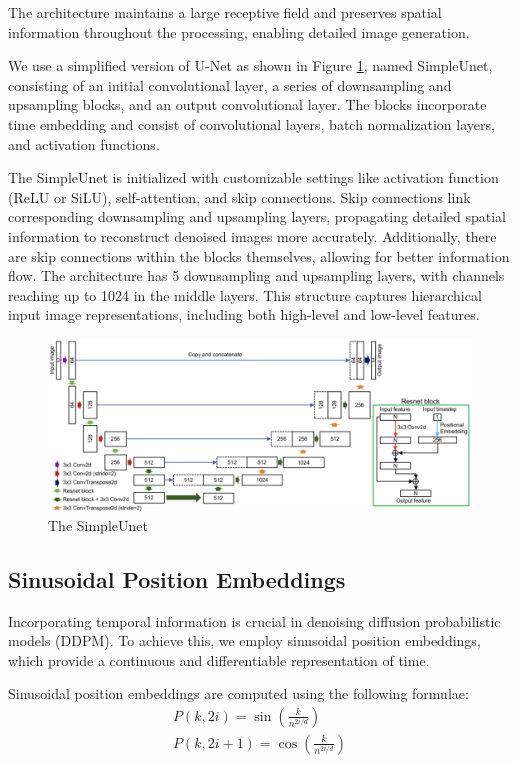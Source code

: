 \documentclass[letterpaper]{article} %
\begin{document}
The architecture maintains a large receptive field and preserves spatial information throughout the processing, enabling detailed image generation.  

We use a simplified version of U-Net as shown in Figure \ref{fig:figure3}, named SimpleUnet, consisting of an initial convolutional layer, a series of downsampling and upsampling blocks, and an output convolutional layer. The blocks incorporate time embedding and consist of convolutional layers, batch normalization layers, and activation functions.

The SimpleUnet is initialized with customizable settings like activation function (ReLU or SiLU), self-attention, and skip connections.
Skip connections link corresponding downsampling and upsampling layers, propagating detailed spatial information to reconstruct denoised images more accurately. Additionally, there are skip connections within the blocks themselves, allowing for better information flow. The architecture has 5 downsampling and upsampling layers, with channels reaching up to 1024 in the middle layers. This structure captures hierarchical input image representations, including both high-level and low-level features.

\begin{figure}[htbp]
    \centering
    \includegraphics[width=0.82\linewidth]{f3.png} %
    \caption{The SimpleUnet}
    \label{fig:figure3}
\end{figure}

\subsection{Sinusoidal Position Embeddings}
Incorporating temporal information is crucial in denoising diffusion probabilistic models (DDPM). To achieve this, we employ sinusoidal position embeddings\cite{positional_encoding}, which provide a continuous and differentiable representation of time.

Sinusoidal position embeddings are computed using the following formulae:
\begin{equation}
\begin{aligned}
P(k, 2 i)=\sin \left(\frac{k}{n^{2 i / d}}\right) \\
P(k, 2 i+1)=\cos \left(\frac{k}{n^{2 i / d}}\right)
\end{aligned}
\end{equation}
\end{document}

